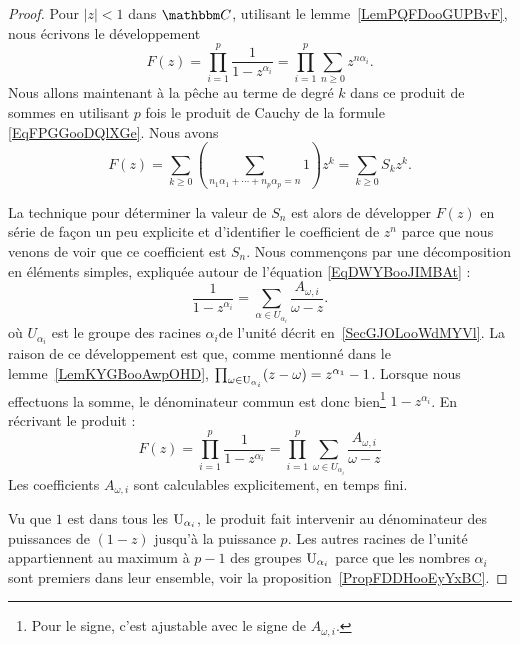 \begin{proof}
    Pour \( | z |<1\) dans \( \eC\), utilisant le lemme~\ref{LemPQFDooGUPBvF}, nous écrivons le développement
    \begin{equation}
        F(z)=\prod_{i=1}^p\frac{1}{ 1-z^{\alpha_i} }=\prod_{i=1}^p\sum_{n\geq 0}z^{n\alpha_i}.
    \end{equation}
    Nous allons maintenant à la pêche au terme de degré \( k\) dans ce produit de sommes en utilisant \( p\) fois le produit de Cauchy de la formule \eqref{EqFPGGooDQlXGe}. Nous avons
    \begin{equation}
        F(z)=\sum_{k\geq 0}\left( \sum_{n_1\alpha_1+\cdots +n_p\alpha_p=n}1 \right)z^k=\sum_{k\geq 0}S_kz^k.
    \end{equation}

    La technique pour déterminer la valeur de \( S_n\) est alors de développer \( F(z)\) en série de façon un peu explicite et d'identifier le coefficient de \( z^n\) parce que nous venons de voir que ce coefficient est \( S_n\). Nous commençons par une décomposition en éléments simples, expliquée autour de l'équation \eqref{EqDWYBooJIMBAt} :
    \begin{equation}
        \frac{1}{ 1-z^{\alpha_i} }=\sum_{\alpha\in U_{\alpha_i}}\frac{ A_{\omega,i} }{ \omega-z }.
    \end{equation}
    où \( U_{\alpha_i}\) est le groupe des racines \( \alpha_i\)\ieme de l'unité décrit en~\ref{SecGJOLooWdMYVl}. La raison de ce développement est que, comme mentionné dans le lemme~\ref{LemKYGBooAwpOHD}, \( \prod_{\omega\in\operatorname{U}_{\alpha_i}}(z-\omega)=z^{\alpha_1}-1\). Lorsque nous effectuons la somme, le dénominateur commun est donc bien\footnote{Pour le signe, c'est ajustable avec le signe de \( A_{\omega,i}\).} \( 1-z^{\alpha_i}\).
    En récrivant le produit :
    \begin{equation}
        F(z)=\prod_{i=1}^{p}\frac{1}{ 1-z^{\alpha_i} }=\prod_{i=1}^p\sum_{\omega\in U_{\alpha_i}}\frac{ A_{\omega,i} }{ \omega-z }
    \end{equation}
    Les coefficients \( A_{\omega,i}\) sont calculables explicitement, en temps fini.

    Vu que \( 1\) est dans tous les \( \operatorname{U}_{\alpha_i}\), le produit fait intervenir au dénominateur des puissances de \( (1-z)\) jusqu'à la puissance \( p\). Les autres racines de l'unité appartiennent au maximum à \( p-1\) des groupes \( \operatorname{U}_{\alpha_i}\) parce que les nombres \( \alpha_i\) sont premiers dans leur ensemble, voir la proposition~\ref{PropFDDHooEyYxBC}.


\end{proof}
